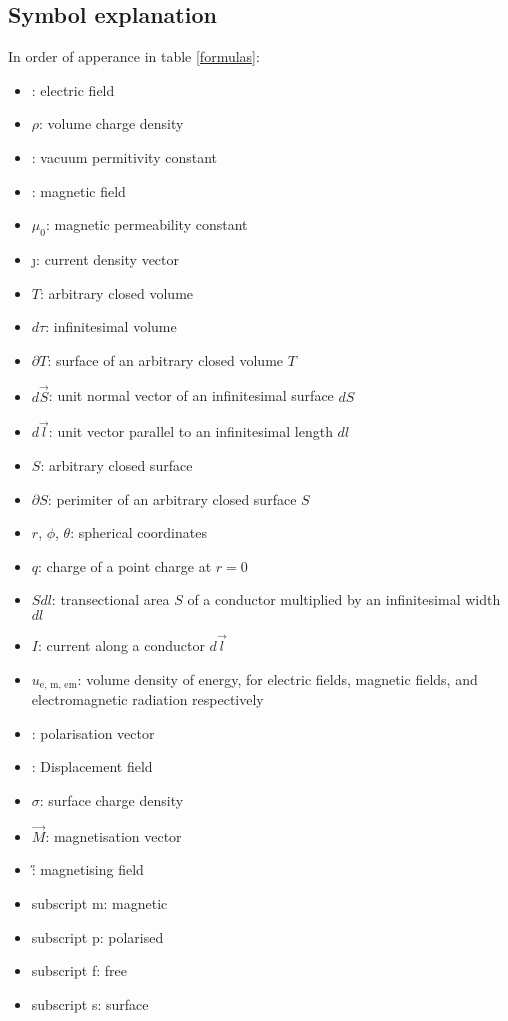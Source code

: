     \subsection{Symbol explanation}
    In order of apperance in table \ref{formulas}:  
    \begin{itemize}
        \setlength\itemsep{.1em}
        \item \E: electric field 
        \item $\rho$: volume charge density
        \item \e: vacuum permitivity constant
        \item \B: magnetic field
        \item $\mu_0$: magnetic permeability constant
        \item \j: current density vector
        \item $T$: arbitrary closed volume
        \item $d\tau$: infinitesimal volume
        \item $\partial T$: surface of an arbitrary closed volume $T$
        \item $d\vec{S}$: unit normal vector of an infinitesimal surface $dS$
        \item $d\vec{l}$: unit vector parallel to an infinitesimal length $dl$
        \item $S$: arbitrary closed surface
        \item $\partial S$: perimiter of an arbitrary closed surface $S$
        \item $r$, $\phi$, $\theta$: spherical coordinates
        \item $q$: charge of a point charge at $r=0$
        \item $Sdl$: transectional area $S$ of a conductor multiplied by an infinitesimal width $dl$
        \item $I$: current along a conductor $d\vec{l}$
        \item $u_\text{e, m, em}$: volume density of energy, for electric fields, magnetic fields, and electromagnetic radiation respectively
        \item \p: polarisation vector
        \item \D: Displacement field
        \item $\sigma$: surface charge density
        \item $\vec{M}$: magnetisation vector
        \item \H: magnetising field
        \item subscript m: magnetic
        \item subscript p: polarised
        \item subscript f: free 
        \item subscript s: surface
    \end{itemize}
